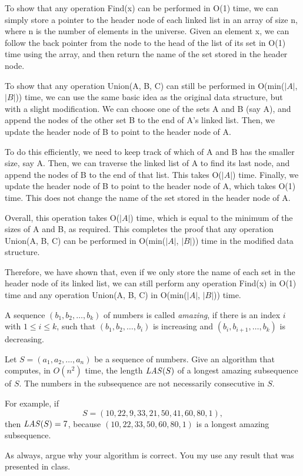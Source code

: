 \documentclass[12pt]{article}
\newcommand{\LAS}{\mathord{\it LAS}}
\newcounter{ques}
\newenvironment{question}{\stepcounter{ques}{\noindent\bf Question \arabic{ques}:}}{\vspace{5mm}}
\newenvironment{solution}{{\noindent\bf Solution:}}{\vspace{5mm}}
\begin{document}
\begin{solution}
      
      To show that any operation Find(x) can be performed in O(1) time, we can simply store a pointer to the header node of each linked list in an array of size n, where n is the number of elements in the universe. 
      Given an element x, we can follow the back pointer from the node to the head of the list of its set in O(1) time using the array, and then return the name of the set stored in the header node.

      To show that any operation Union(A, B, C) can still be performed in O(min($|A|$, $|B|$)) time, we can use the same basic idea as the original data structure, but with a slight modification. 
      We can choose one of the sets A and B (say A), and append the nodes of the other set B to the end of A's linked list. Then, we update the header node of B to point to the header node of A.

      To do this efficiently, we need to keep track of which of A and B has the smaller size, say A. 
      Then, we can traverse the linked list of A to find its last node, and append the nodes of B to the end of that list. This takes O($|A|$) time. 
      Finally, we update the header node of B to point to the header node of A, which takes O(1) time. 
      This does not change the name of the set stored in the header node of A.

      Overall, this operation takes O($|A|$) time, which is equal to the minimum of the sizes of A and B, as required. 
      This completes the proof that any operation Union(A, B, C) can be performed in O(min($|A|$, $|B|$)) time in the modified data structure.

      Therefore, we have shown that, even if we only store the name of each set in the header node of its linked list, we can still perform any operation Find(x) in O(1) time and any operation Union(A, B, C) in O(min($|A|$, $|B|$)) time.
\end{solution}

\begin{question} 
A sequence $(b_1,b_2,\ldots,b_k)$ of numbers is called \emph{amazing}, 
if there is an index $i$ with $1 \leq i \leq k$, such that 
$(b_1,b_2,\ldots,b_i)$ is increasing and $(b_i, b_{i+1}, \ldots,b_k)$ 
is decreasing. 

Let $S=(a_1,a_2,\ldots,a_n)$ be a sequence of numbers. Give an algorithm 
that computes, in $O(n^2)$ time, the length $\LAS(S)$ of a longest 
amazing subsequence of $S$. The numbers in the subsequence are not 
necessarily consecutive in $S$. 

For example, if 
\[ S=(10,22,9,33,21,50,41,60,80,1) , 
\]
then $\LAS(S) = 7$, because $(10,22,33,50,60,80,1)$ is a longest amazing 
subsequence. 

As always, argue why your algorithm is correct. You my use any result 
that was presented in class.  
\end{question}
\end{document}
